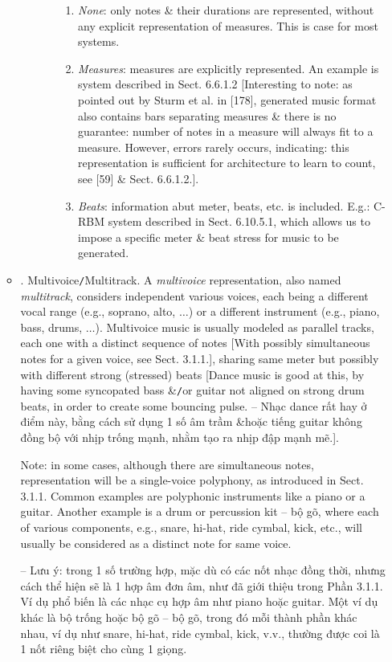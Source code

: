 \documentclass{article}
\begin{document}
\begin{itemize}
\begin{itemize}
\begin{itemize}
\begin{itemize}
\begin{enumerate}
					\item {\it None}: only notes \& their durations are represented, without any explicit representation of measures. This is case for most systems.
					\item {\it Measures}: measures are explicitly represented. An example is system described in Sect. 6.6.1.2 [Interesting to note: as pointed out by Sturm et al. in [178], generated music format also contains bars separating measures \& there is no guarantee: number of notes in a measure will always fit to a measure. However, errors rarely occurs, indicating: this representation is sufficient for architecture to learn to count, see [59] \& Sect. 6.6.1.2.].
					\item {\it Beats}: information abut meter, beats, etc. is included. E.g.: C-RBM system described in Sect. 6.10.5.1, which allows us to impose a specific meter \& beat stress for music to be generated.
				\end{enumerate}
			\end{itemize}
		\end{itemize}
		\item {. Multivoice{\tt/}Multitrack.} A {\it multivoice} representation, also named {\it multitrack}, considers independent various voices, each being a different vocal range (e.g., soprano, alto, $\ldots$) or a different instrument (e.g., piano, bass, drums, $\ldots$). Multivoice music is usually modeled as  parallel tracks, each one with a distinct sequence of notes [With possibly simultaneous notes for a given voice, see Sect. 3.1.1.], sharing same meter but possibly with different strong (stressed) beats [Dance music is good at this, by having some syncopated bass \&{\tt/}or guitar not aligned on strong drum beats, in order to create some bouncing pulse. -- Nhạc dance rất hay ở điểm này, bằng cách sử dụng 1 số âm trầm \&{\tt}hoặc tiếng guitar không đồng bộ với nhịp trống mạnh, nhằm tạo ra nhịp đập mạnh mẽ.].
		
		Note: in some cases, although there are simultaneous notes, representation will be a single-voice polyphony, as introduced in Sect. 3.1.1. Common examples are polyphonic instruments like a piano or a guitar. Another example is a drum or percussion kit -- bộ gõ, where each of various components, e.g., snare, hi-hat, ride cymbal, kick, etc., will usually be considered as a distinct note for same voice.
		
		-- Lưu ý: trong 1 số trường hợp, mặc dù có các nốt nhạc đồng thời, nhưng cách thể hiện sẽ là 1 hợp âm đơn âm, như đã giới thiệu trong Phần 3.1.1. Ví dụ phổ biến là các nhạc cụ hợp âm như piano hoặc guitar. Một ví dụ khác là bộ trống hoặc bộ gõ -- bộ gõ, trong đó mỗi thành phần khác nhau, ví dụ như snare, hi-hat, ride cymbal, kick, v.v., thường được coi là 1 nốt riêng biệt cho cùng 1 giọng.
		

\end{itemize}
\end{itemize}
\end{document}
